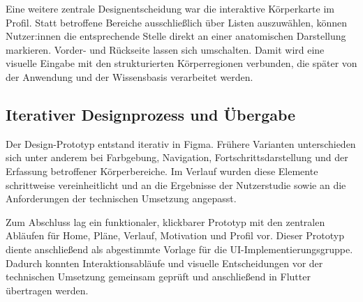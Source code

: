 Eine weitere zentrale Designentscheidung war die interaktive Körperkarte im Profil. Statt betroffene Bereiche ausschließlich über Listen auszuwählen, können Nutzer:innen die entsprechende Stelle direkt an einer anatomischen Darstellung markieren. Vorder- und Rückseite lassen sich umschalten. Damit wird eine visuelle Eingabe mit den strukturierten Körperregionen verbunden, die später von der Anwendung und der Wissensbasis verarbeitet werden.

\subsection{Iterativer Designprozess und Übergabe}

Der Design-Prototyp entstand iterativ in Figma. Frühere Varianten unterschieden sich unter anderem bei Farbgebung, Navigation, Fortschrittsdarstellung und der Erfassung betroffener Körperbereiche. Im Verlauf wurden diese Elemente schrittweise vereinheitlicht und an die Ergebnisse der Nutzerstudie sowie an die Anforderungen der technischen Umsetzung angepasst.

Zum Abschluss lag ein funktionaler, klickbarer Prototyp mit den zentralen Abläufen für Home, Pläne, Verlauf, Motivation und Profil vor. Dieser Prototyp diente anschließend als abgestimmte Vorlage für die UI-Implementierungsgruppe. Dadurch konnten Interaktionsabläufe und visuelle Entscheidungen vor der technischen Umsetzung gemeinsam geprüft und anschließend in Flutter übertragen werden.
